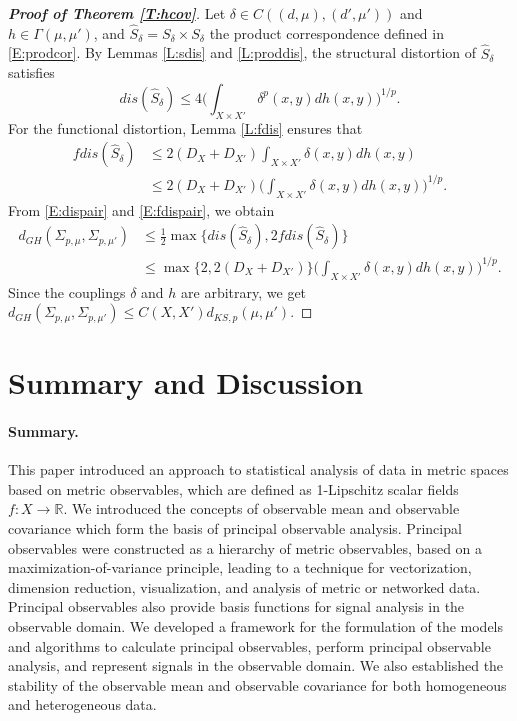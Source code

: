 \documentclass[11pt]{article}
\theoremstyle{definition}
\newcommand{\real}{\ensuremath{\mathbb{R}}}
\newcommand{\dks}{\ensuremath{d_{KS,p}}}
\newcommand{\dgh}{\ensuremath{d_{GH}}}
\newcommand{\covp}[1]{\ensuremath{\Sigma_{p,#1}}}
\begin{document}
\begin{proof}[\bf Proof of Theorem \ref{T:hcov}]
Let $\delta \in C((d,\mu),(d',\mu'))$ and $h \in \Gamma(\mu,\mu')$, and $\hat{S}_\delta = S_\delta \times S_\delta$ the product correspondence defined in \eqref{E:prodcor}. By Lemmas \ref{L:sdis} and \ref{L:proddis}, the structural distortion of $\hat{S}_\delta$ satisfies
\begin{equation} \label{E:dispair}
dis(\hat{S}_\delta) \leq 4 \Big( \int_{X \times X'} \delta^p (x,y) dh (x,y) \Big)^{1/p}.
\end{equation}
For the functional distortion, Lemma \ref{L:fdis} ensures that
\begin{equation} \label{E:fdispair}
\begin{split}
fdis(\hat{S}_\delta) &\leq 2(D_X + D_{X'}) \int_{X \times X'} \delta (x,y) dh (x,y) \\
&\leq 2(D_X + D_{X'}) \Big(\int_{X \times X'} \delta (x,y) dh (x,y)\Big)^{1/p}.
\end{split}
\end{equation}
From \eqref{E:dispair} and \eqref{E:fdispair}, we obtain
\begin{equation}
\begin{split}
\dgh(\covp{\mu}, \covp{\mu'}) &\leq 
\frac{1}{2} \max\{dis(\hat{S}_\delta), 2fdis(\hat{S}_\delta)\} \\
&\leq \max\{2, 2 (D_X + D_{X'})\} \Big(\int_{X \times X'} \delta (x,y) dh (x,y)\Big)^{1/p}.
\end{split}
\end{equation}
Since the couplings $\delta$ and $h$ are arbitrary, we get $\dgh(\covp{\mu}, \covp{\mu'}) \leq C(X,X') \dks(\mu,\mu')$.
\end{proof}


\section{Summary and Discussion} \label{S:summary}

\paragraph {Summary.} This paper introduced an approach to statistical analysis of data in metric spaces based on metric observables, which are defined as 1-Lipschitz scalar fields $f \colon X \to \real$. We introduced the concepts of observable mean and observable covariance which form the basis of principal observable analysis. Principal observables were constructed as a hierarchy of metric observables, based on a maximization-of-variance principle, leading to a technique for vectorization, dimension reduction, visualization, and analysis of metric or networked data. Principal observables also provide basis functions for signal analysis in the observable domain. We developed a framework for the formulation of the models and algorithms to calculate principal observables, perform principal observable analysis, and represent signals in the observable domain. We also established the stability of the observable mean and observable covariance for both homogeneous and heterogeneous data.
\end{document}
